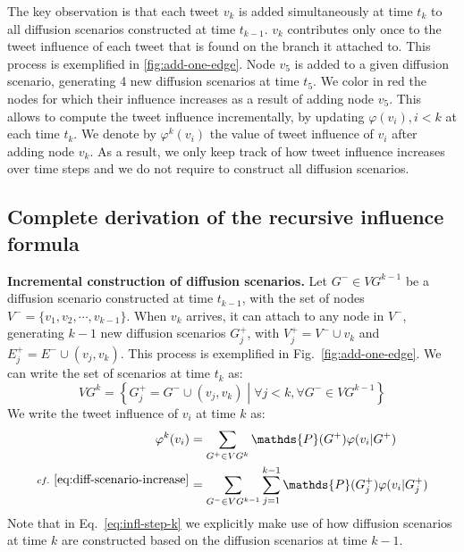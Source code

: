 The key observation is that each tweet $v_k$ is added simultaneously at time $t_k$ to all diffusion scenarios constructed at time $t_{k-1}$.
$v_k$ contributes only once to the tweet influence of each tweet that is found on the branch it attached to.
This process is exemplified in \cref{fig:add-one-edge}.
Node $v_5$ is added to a given diffusion scenario, generating 4 new diffusion scenarios at time $t_5$.
We color in red the nodes for which their influence increases as a result of adding node $v_5$.
%
This allows to compute the tweet influence incrementally, by updating $\varphi(v_i), i < k$ at each time $t_k$.
We denote by $\varphi^k(v_i)$ the value of tweet influence of $v_i$ after adding node $v_k$.
As a result, we only keep track of how tweet influence increases over time steps and we do not require to construct all diffusion scenarios.

\subsection{Complete derivation of the recursive influence formula}

\textbf{Incremental construction of diffusion scenarios.}
Let $G^- \in VG^{k-1}$ be a diffusion scenario constructed at time $t_{k-1}$, with the set of nodes $V^- = \{ v_1,v_2,\cdots,v_{k-1} \}$.
When $v_k$ arrives, it can attach to any node in $V^-$, generating $k-1$ new diffusion scenarios $G_j^+$, with $V_j^+ = V^- \cup v_k$ and $E_j^+ = E^- \cup (v_j, v_k)$.
This process is exemplified in Fig.~\ref{fig:add-one-edge}.
We can write the set of scenarios at time $t_k$ as:
\begin{equation} \label{eq:diff-scenario-increase}
	VG^k = \left\lbrace G_j^+ = G^- \cup (v_j, v_k) \middle| \forall j < k, \forall G^- \in VG^{k-1} \right\rbrace
\end{equation}     
We write the tweet influence of $v_i$ at time $k$ as:
%
%
% 
\begin{align}
	\varphi^k(v_i) &= \sum_{G^+ \in {VG^k}} \mathds{P}(G^+) \varphi(v_i|G^+) \nonumber \\
	^{cf.~\eqref{eq:diff-scenario-increase}} &= \sum_{G^- \in {VG^{k-1}}}\sum^{k-1}_{j=1}\mathds{P}(G_j^+) \varphi(v_i|G_j^+) \label{eq:infl-step-k}
\end{align}
Note that in Eq.~\eqref{eq:infl-step-k} we explicitly make use of how diffusion scenarios at time $k$ are constructed based on the diffusion scenarios at time $k-1$.

